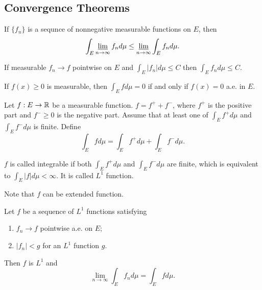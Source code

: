 \documentclass[class=book, crop=false]{standalone}
\begin{document}
        \subsection{Convergence Theorems}
        \begin{theorem}
            If $\{f_n\}$ is a sequnce of nonnegative measurable functions on $E$, then
            \begin{equation*}
                \int_E \varliminf_{n \rightarrow \infty} f_n d\mu \leq \varliminf_{n \rightarrow \infty} \int_E f_n d\mu.
            \end{equation*}
        \end{theorem}
        \begin{corollary}
            If measurable $f_n \rightarrow f$ pointwise on $E$ and $\int_E |f_n| d\mu \leq C$ then $\int_E f_n d\mu \leq C$.
        \end{corollary}
        
        \begin{theorem}
            If $f(x) \geq 0$ is measurable, then $\int_E f d\mu = 0$ if and only if $f(x) = 0$ a.e. in $E$.
        \end{theorem}

        \begin{definition}
            Let $f : E \rightarrow \mathbb{R}$ be a measurable function. $f = f^+ + f^-$, where $f^+$ is the positive part and $f^- \geq 0$ is the negative part. Assume that at least one of $\int_E f^+ d\mu$ and $\int_E f^- d\mu$ is finite. Define
            \begin{equation*}
                \int_E f d\mu = \int_E f^+ d\mu + \int_E f^- d\mu.
            \end{equation*}
        \end{definition}

        \begin{definition}
            $f$ is called integrable if both $\int_E f^+ d\mu$ and $\int_E f^- d\mu$ are finite, which is equivalent to $\int_E |f| d\mu < \infty$. It is called $L^1$ function.
        \end{definition}
        \begin{remark}
            Note that $f$ can be extended function.
        \end{remark}

        \begin{theorem}
            Let $f$ be a sequence of $L^1$ functions satisfying
            \begin{enumerate}
                \item $f_n \rightarrow f$ pointwise a.e. on $E$;
                \item $|f_n| < g$ for an $L^1$ function $g$.
            \end{enumerate}
            Then $f$ is $L^1$ and
            \begin{equation*}
                \lim_{n \rightarrow \infty} \int_E f_n d\mu = \int_E f d\mu.
            \end{equation*}
        \end{theorem}
\end{document}
